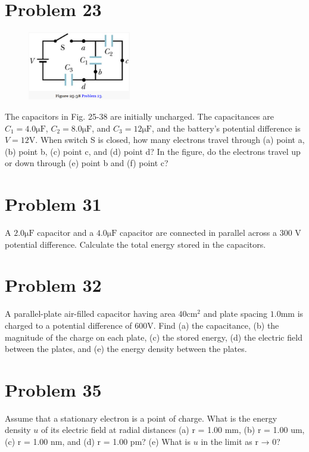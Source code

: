 \documentclass[12pt]{article}
\begin{document}
\section{Problem 23}
\begin{figure}
    \vspace{-30pt}
    \includegraphics[width=0.4\textwidth]{picture_6.png} 
\end{figure}
The capacitors in Fig. 25-38 are initially uncharged. 
The capacitances are $C_1 = 4.0 \unit{\micro\farad}$, $C_2 = 8.0 \unit{\micro\farad}$, and $C_3 = 12 \unit{\micro\farad}$, and the battery's potential difference is $V = 12 \unit{\volt}$. 
When switch S is closed, how many electrons travel through (a) point a, (b) point b, (c) point c, and (d) point d? 
In the figure, do the electrons travel up or down through (e) point b and (f) point c?

\pagebreak
\section{Problem 31}
A $2.0 \unit{\micro\farad}$ capacitor and a $4.0 \unit{\micro\farad}$ capacitor are connected in parallel across a 300 V potential difference.
Calculate the total energy stored in the capacitors.

\pagebreak
\section{Problem 32}
A parallel-plate air-filled capacitor having area $40\unit{\centi\meter^2}$ and plate spacing $1.0 \unit{\milli\meter}$ is charged to a potential difference of $600 \unit{\volt}$. 
Find (a) the capacitance, (b) the magnitude of the charge on each plate, (c) the stored energy, (d) the electric field between the plates, and (e) the energy density between the plates.

\pagebreak
\section{Problem 35}
Assume that a stationary electron is a point of charge. 
What is the energy density $u$ of its electric field at radial distances (a) r = 1.00 mm, (b) r = 1.00 um, (c) r = 1.00 nm, and (d) r = 1.00 pm? 
(e) What is $u$ in the limit as r → 0?
\end{document}
